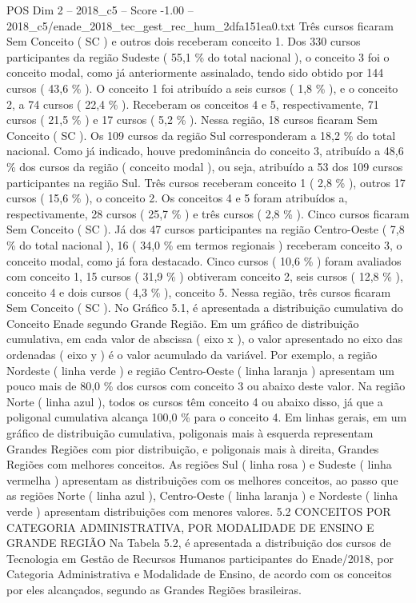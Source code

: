 \begin{textsample}{POS Dim 2 – 2018\_c5 – Score -1.00 – 2018\_c5/enade\_2018\_tec\_gest\_rec\_hum\_2dfa151ea0.txt}
Três cursos ficaram Sem Conceito ( SC ) e outros dois receberam conceito 1.
Dos 330 cursos participantes da região Sudeste ( 55,1 \% do total nacional ), o conceito 3 foi o conceito modal, como já anteriormente assinalado, tendo sido obtido por 144 cursos ( 43,6 \% ).
O conceito 1 foi atribuído a seis cursos ( 1,8 \% ), e o conceito 2, a 74 cursos ( 22,4 \% ).
Receberam os conceitos 4 e 5, respectivamente, 71 cursos ( 21,5 \% ) e 17 cursos ( 5,2 \% ).
Nessa região, 18 cursos ficaram Sem Conceito ( SC ).
Os 109 cursos da região Sul corresponderam a 18,2 \% do total nacional.
Como já indicado, houve predominância do conceito 3, atribuído a 48,6 \% dos cursos da região ( conceito modal ), ou seja, atribuído a 53 dos 109 cursos participantes na região Sul.
Três cursos receberam conceito 1 ( 2,8 \% ), outros 17 cursos ( 15,6 \% ), o conceito 2.
Os conceitos 4 e 5 foram atribuídos a, respectivamente, 28 cursos ( 25,7 \% ) e três cursos ( 2,8 \% ).
Cinco cursos ficaram Sem Conceito ( SC ).
Já dos 47 cursos participantes na região Centro-Oeste ( 7,8 \% do total nacional ), 16 ( 34,0 \% em termos regionais ) receberam conceito 3, o conceito modal, como já fora destacado.
Cinco cursos ( 10,6 \% ) foram avaliados com conceito 1, 15 cursos ( 31,9 \% ) obtiveram conceito 2, seis cursos ( 12,8 \% ), conceito 4 e dois cursos ( 4,3 \% ), conceito 5.
Nessa região, três cursos ficaram Sem Conceito ( SC ).
No Gráfico 5.1, é apresentada a distribuição cumulativa do Conceito Enade segundo Grande Região.
Em um gráfico de distribuição cumulativa, em cada valor de abscissa ( eixo x ), o valor apresentado no eixo das ordenadas ( eixo y ) é o valor acumulado da variável.
Por exemplo, a região Nordeste ( linha verde ) e região Centro-Oeste ( linha laranja ) apresentam um pouco mais de 80,0 \% dos cursos com conceito 3 ou abaixo deste valor.
Na região Norte ( linha azul ), todos os cursos têm conceito 4 ou abaixo disso, já que a poligonal cumulativa alcança 100,0 \% para o conceito 4.
Em linhas gerais, em um gráfico de distribuição cumulativa, poligonais mais à esquerda representam Grandes Regiões com pior distribuição, e poligonais mais à direita, Grandes Regiões com melhores conceitos.
As regiões Sul ( linha rosa ) e Sudeste ( linha vermelha ) apresentam as distribuições com os melhores conceitos, ao passo que as regiões Norte ( linha azul ), Centro-Oeste ( linha laranja ) e Nordeste ( linha verde ) apresentam distribuições com menores valores. 5.2 CONCEITOS POR CATEGORIA ADMINISTRATIVA, POR MODALIDADE DE ENSINO E GRANDE REGIÃO Na Tabela 5.2, é apresentada a distribuição dos cursos de Tecnologia em Gestão de Recursos Humanos participantes do Enade/2018, por Categoria Administrativa e Modalidade de Ensino, de acordo com os conceitos por eles alcançados, segundo as Grandes Regiões brasileiras.

\end{textsample}
